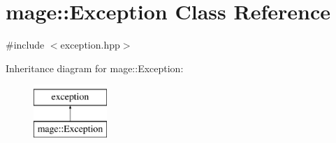 \hypertarget{classmage_1_1_exception}{}\section{mage\+:\+:Exception Class Reference}
\label{classmage_1_1_exception}


{\ttfamily \#include $<$exception.\+hpp$>$}

Inheritance diagram for mage\+:\+:Exception\+:\begin{figure}[H]
\begin{center}
\leavevmode
\includegraphics[height=2.000000cm]{classmage_1_1_exception}
\end{center}
\end{figure}
